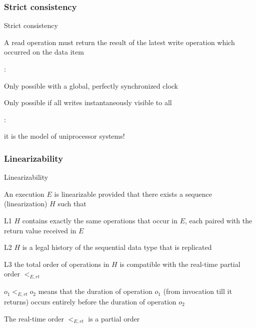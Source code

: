 \subsubsection{Strict consistency}

\begin{frame}{Strict consistency}

\begin{definition}
A read operation must return the result of the latest write operation which occurred on the data item
\end{definition}

\smallskip
{}:\\
\BI
\item Only possible with a global, perfectly synchronized clock
\item Only possible if all writes instantaneously visible to all
\EI

\smallskip
{}:\\
\BI
\item it is the model of uniprocessor systems!
\EI

\end{frame}

\subsubsection{Linearizability}

\begin{frame}[t]{Linearizability}

\begin{definition}
An execution $E$ is linearizable provided that there exists a sequence (\alert{linearization}) $H$ such that
\BE
\item[L1] $H$ contains exactly the same operations that occur in $E$, each paired with the return value received in $E$
\item[L2] $H$ is a legal history of the sequential data type that is replicated
\item[L3] the total order of operations in $H$ is \alert{compatible} with the real-time partial order $<_{E,rt}$
\EE	
\end{definition}

\BI
\item $o_1 <_{E,rt} o_2$ means that the duration of operation $o_1$ (from invocation till it returns) occurs entirely before the duration of operation $o_2$
\item The \alert{real-time order} $<_{E,rt}$ is a partial order
\EI
\end{frame}

